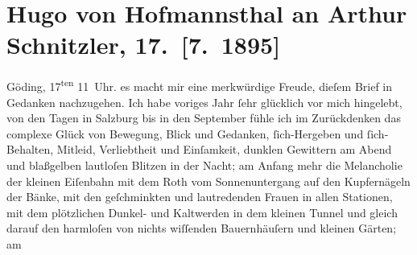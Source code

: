 

               \section[Hugo von Hofmannsthal an Arthur Schnitzler, 17. {[}7. 1895{]}]{ Hugo von Hofmannsthal an Arthur Schnitzler, 17. {[}7. 1895{]}}\nopagebreak{}\rehead{ }\begin{ledgroupsized}[t]{13cm}\normalsize\beginnumbering{} \toendnotes[C]{\smallbreak\pagebreak[2]} 
\toendnotes[C]{\smallbreak}\pstart
           \raggedleft{}{\pb}Göding, 17\textsuperscript{ten}{ }11 Uhr. \pend
           \pstart
           \raggedleft{}\textcolor{gray}{\textbf{}}\pend
           \pstart
           es macht mir eine merkwürdige Freude, dieſem Brief in Gedanken nachzugehen. Ich
                    habe voriges Jahr ſehr glücklich vor mich hingelebt, von den Tagen in Salzburg bis in den September fühle
                    ich im Zurückdenken das complexe Glück von Bewegung, Blick und Gedanken,
                    ſich-Hergeben und ſich-Behalten, Mitleid, Verliebtheit und Einſamkeit, dunklen
                    Gewittern am Abend und blaßgelben lautloſen Blitzen in der Nacht; am Anfang mehr
                    die Melancholie der kleinen Eiſenbahn mit dem Roth vom Sonnenuntergang auf den
                    Kupfernägeln der Bänke, mit den geſchminkten und lautredenden {\pb}Frauen in allen Stationen,
                    mit dem plötzlichen Dunkel- und Kaltwerden in dem kleinen Tunnel und gleich
                    darauf den harmloſen von nichts wiſſenden Bauernhäuſern und kleinen Gärten; am

\end{ledgroupsized}

